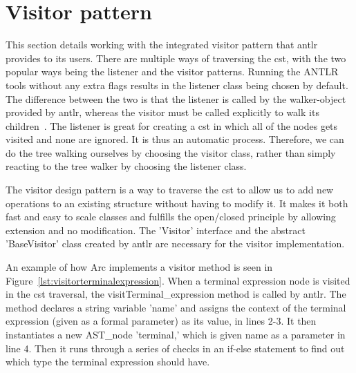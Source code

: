 \section{Visitor pattern}\label{sec:visitorpattern}
This section details working with the integrated visitor pattern that \gls{antlr} provides to its users. There are multiple ways of traversing the \gls{cst}, with the two popular ways being the listener and the visitor patterns. Running the ANTLR tools without any extra flags results in the listener class being chosen by default. The difference between the two is that the listener is called by the walker-object provided by \gls{antlr}, whereas the visitor must be called explicitly to walk its children~\cite{Parr2014}. The listener is great for creating a \gls{cst} in which all of the nodes gets visited and none are ignored. It is thus an automatic process. Therefore, we can do the tree walking ourselves by choosing the visitor class, rather than simply reacting to the tree walker by choosing the listener class.

The visitor design pattern is a way to traverse the \gls{cst} to allow us to add new operations to an existing structure without having to modify it. It makes it both fast and easy to scale classes and fulfills the open/closed principle by allowing extension and no modification. The 'Visitor' interface and the abstract 'BaseVisitor' class created by \gls{antlr} are necessary for the visitor implementation.

An example of how Arc implements a visitor method is seen in Figure~\ref{lst:visitorterminalexpression}. When a terminal expression node is visited in the \gls{cst} traversal, the visitTerminal\_expression method is called by \gls{antlr}. The method declares a string variable 'name' and assigns the context of the terminal expression (given as a formal parameter) as its value, in lines 2-3. It then instantiates a new AST\_node 'terminal,' which is given name as a parameter in line 4. Then it runs through a series of checks in an if-else statement to find out which type the terminal expression should have.



